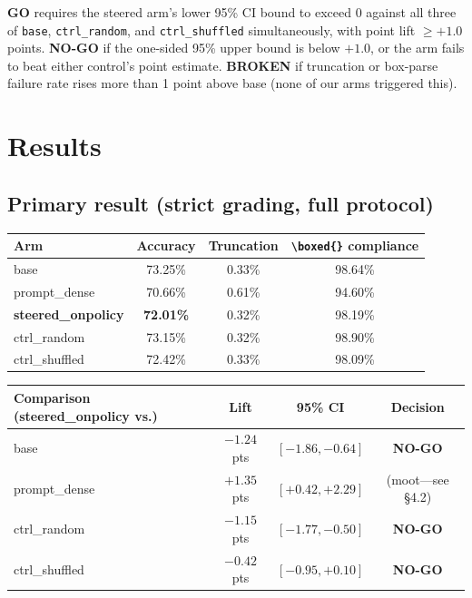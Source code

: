 \documentclass[11pt]{article}
\begin{document}
\textbf{GO} requires the steered arm's lower 95\% CI bound to exceed 0 against all three of
\texttt{base}, \texttt{ctrl\_random}, and \texttt{ctrl\_shuffled} simultaneously, with point lift
$\ge +1.0$ points. \textbf{NO-GO} if the one-sided 95\% upper bound is below $+1.0$, or the arm
fails to beat either control's point estimate. \textbf{BROKEN} if truncation or box-parse failure
rate rises more than 1 point above base (none of our arms triggered this).

\section{Results}

\subsection{Primary result (strict grading, full protocol)}

\begin{table}[H]
\centering
\begin{tabular}{lccc}
\toprule
Arm & Accuracy & Truncation & \texttt{\textbackslash boxed\{\}} compliance \\
\midrule
base & 73.25\% & 0.33\% & 98.64\% \\
prompt\_dense & 70.66\% & 0.61\% & 94.60\% \\
\textbf{steered\_onpolicy} & \textbf{72.01\%} & 0.32\% & 98.19\% \\
ctrl\_random & 73.15\% & 0.32\% & 98.90\% \\
ctrl\_shuffled & 72.42\% & 0.33\% & 98.09\% \\
\bottomrule
\end{tabular}
\end{table}

\begin{table}[H]
\centering
\begin{tabular}{lccc}
\toprule
Comparison (steered\_onpolicy vs.) & Lift & 95\% CI & Decision \\
\midrule
base & $-1.24$ pts & $[-1.86, -0.64]$ & \textbf{NO-GO} \\
prompt\_dense & $+1.35$ pts & $[+0.42, +2.29]$ & (moot---see \S4.2) \\
ctrl\_random & $-1.15$ pts & $[-1.77, -0.50]$ & \textbf{NO-GO} \\
ctrl\_shuffled & $-0.42$ pts & $[-0.95, +0.10]$ & \textbf{NO-GO} \\
\bottomrule
\end{tabular}
\end{table}
\end{document}

